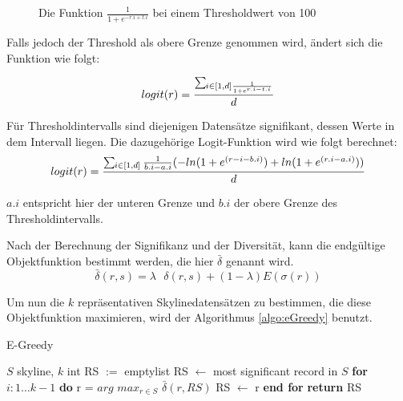 \begin{figure}[H]
	\centering
	\caption{Die Funktion $\frac{1}{1+e^{-r.i+t.i}}$ bei einem Thresholdwert von 100}
	\label{img:logitFunction}
\end{figure}

Falls jedoch der Threshold als obere Grenze genommen wird, ändert sich die Funktion wie folgt:

$$logit(r)=\frac{\sum\mathop{}_{\mkern-5mu i \in{[1,d]}\frac{1}{1+e^{r.i-t.i}}}}{d}$$

Für Thresholdintervalls sind diejenigen Datensätze signifikant, dessen Werte in dem Intervall liegen. Die dazugehörige Logit-Funktion wird wie folgt berechnet:
$$logit(r)=\frac{\sum\limits\mathop{}_{\mkern-5mu i \in{[1,d]}}\frac{1}{b.i-a.i}(-ln(1+e^{(r-i-b.i)})+ln(1+e^{(r.i-a.i)}))}{d}$$

$a.i$ entspricht hier der unteren Grenze und $b.i$ der obere Grenze des Thresholdintervalls. 


Nach der Berechnung der Signifikanz und der Diversität, kann die endgültige Objektfunktion bestimmt werden, die hier $\bar{\delta}$ genannt wird.
$$\bar{\delta}(r,s)= \lambda \text{ } \delta(r,s)+(1- \lambda)E(\sigma(r))$$

Um nun die $k$ repräsentativen Skylinedatensätzen zu bestimmen, die diese Objektfunktion maximieren, wird der Algorithmus \ref{algo:eGreedy} benutzt. 


\begin{algorithm}[H]
\caption{E-Greedy}\label{algo:eGreedy}
\begin{algorithmic}[1]
\INPUTBF $S$ skyline, $k$ int
\State RS $:=$ emptylist
\State RS $\leftarrow$ most significant record in $S$
\State \textbf{for} $i: 1\ldots k-1$ \textbf{do}
\State \hspace{\algorithmicindent}r = $arg$ $max_{r\in{S}}$ $\bar{\delta}(r,RS)$
\State \hspace{\algorithmicindent} RS $\leftarrow$ r
\State \textbf{end for}
\State \textbf{return} RS
\end{algorithmic}
\end{algorithm}

